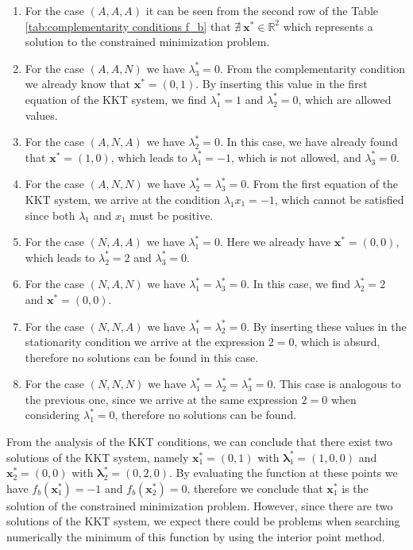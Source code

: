 \documentclass[a4paper,11pt]{article}
\begin{document}
\begin{enumerate}
	\item For the case $(A, A, A)$ it can be seen from the second row of the Table \ref{tab:complementarity conditions f_b} that $\nexists \ \textbf{x}^* \in \mathbb{R}^{2}$ which represents a solution to the constrained minimization problem.
	\item For the case $(A, A, N)$ we have $\lambda_{3}^*=0$. From the complementarity condition we already know that $\textbf{x}^*=(0,1)$. By inserting this value in the first equation of the KKT system, we find $\lambda_{1}^*=1$ and $\lambda_{2}^*=0$, which are allowed values.
	\item For the case $(A, N, A)$ we have $\lambda_{2}^*=0$. In this case, we have already found that $\textbf{x}^*=(1,0)$, which leads to $\lambda_{1}^*=-1$, which is not allowed, and $\lambda_{3}^*=0$.
	\item For the case $(A, N, N)$ we have $\lambda_{2}^*=\lambda_{3}^*=0$. From the first equation of the KKT system, we arrive at the condition $\lambda_{1}x_{1}=-1$, which cannot be satisfied since both $\lambda_{1}$ and $x_{1}$ must be positive.
	\item For the case $(N, A, A)$ we have $\lambda_{1}^*=0$. Here we already have $\textbf{x}^*=(0,0)$, which leads to $\lambda_{2}^*=2$ and $\lambda_{3}^*=0$.
	\item For the case $(N, A, N)$ we have $\lambda_{1}^*=\lambda_{3}^*=0$. In this case, we find $\lambda_{2}^*=2$ and $\textbf{x}^*=(0,0)$.
	\item For the case $(N, N, A)$ we have $\lambda_{1}^*=\lambda_{2}^*=0$. By inserting these values in the stationarity condition we arrive at the expression $2=0$, which is absurd, therefore no solutions can be found in this case.
	\item For the case $(N, N, N)$ we have $\lambda_{1}^*=\lambda_{2}^*=\lambda_{3}^*=0$. This case is analogous to the previous one, since we arrive at the same expression $2=0$ when considering $\lambda_{1}^*=0$, therefore no solutions can be found.
\end{enumerate}
From the analysis of the KKT conditions, we can conclude that there exist two solutions of the KKT system, namely $\textbf{x}_{1}^*=(0,1)$ with $\boldsymbol{\lambda}_{1}^*=(1,0,0)$ and $\textbf{x}_{2}^*=(0,0)$ with $\boldsymbol{\lambda}_{2}^*=(0,2,0)$. By evaluating the function at these points we have $f_{b}(\textbf{x}_{1}^*)=-1$ and  $f_{b}(\textbf{x}_{2}^*)=0$, therefore we conclude that $\textbf{x}_{1}^*$ is the solution of the constrained minimization problem. However, since there are two solutions of the KKT system, we expect there could be problems when searching numerically the minimum of this function by using the interior point method.
\end{document}
